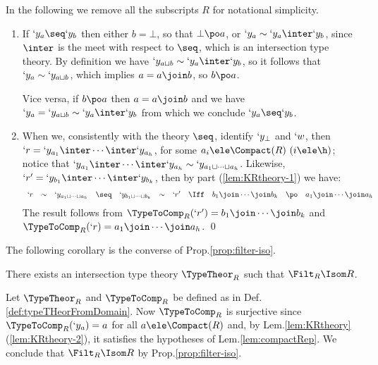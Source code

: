 \documentclass{CSML}
\begin{document}
\proof %
In the following we remove all the subscripts $R$ for notational simplicity.

 \begin{enumerate}

 \item 
If $`y_a \seq `y_b$ then either $b = \bot $, so that $\bot \po a$, or
$`y_a \sim `y_a \inter `y_b$, since $\inter$ is the meet with respect to $\seq$, which is an intersection type theory. 
By definition we have $`y_{a \sqcup b} \sim `y_a \inter `y_b$, so it follows that $`y_a \sim `y_{a \sqcup b}$, which implies $a = a \join b $, so $b \po a$.

Vice versa, if $b \po a$ then $a = a \join b$ and we have $`y_a = `y_{a \sqcup b} \sim `y_a \inter `y_b$ from which we conclude $`y_a \seq `y_b$.
	
 \item 
When we, consistently with the theory $\seq$, identify $`y_\bot$ and $`w$, then $`r = `y_ {a_1}\inter \cdots \inter `y_{a_h}$, for some $a_i \ele \Compact(R) ~ (i \ele \h)$; notice that $`y_ {a_1}\inter \cdots \inter `y_{a_h} \sim `y_{a_1\sqcup\cdots\sqcup a_h}$. 
Likewise, $`r' = `y_ {b_1}\inter \cdots \inter `y_{b_k } $, then by part (\ref{lem:KRtheory-1}) we have:
%
 \[ \begin{array}{rcl@{\quad}lccc@{\quad}c@{\quad}ccc}
`r 
	& \sim & 
`y_{a_1\sqcup\cdots\sqcup a_h} 
	& \seq & 
`y_{b_1\sqcup\cdots\sqcup b_k } 
	& \sim & 
`r' 
	&\Iff&
b_1\join\cdots\join b_k 
	&\po&
a_1\join\cdots\join a_h
 \end{array} \]
The result follows from %
$\TypeToComp_R(`r') = b_1\join\cdots\join b_k$ and $\TypeToComp_R(`r) = a_1\join\cdots\join a_h$.%
\qed
 \end{enumerate}

\noindent The following corollary is the converse of Prop.\skp\ref{prop:filter-iso}.


 \begin{cor} \label{cor:fromDomToFilter}
There exists an intersection type theory $\TypeTheor_R$ such that $\Filt_R \Isom R$.
 \end{cor}

 \begin{Proof}
Let $\TypeTheor_R$ and $\TypeToComp_R$ be defined as in Def.\skp\ref{def:typeTHeorFromDomain}.
Now $\TypeToComp_R$ is surjective since $\TypeToComp_R(`y_a) = a$ for all $a\ele \Compact(R)$ and, by Lem.\skp\ref{lem:KRtheory}\,(\ref{lem:KRtheory-2}), it satisfies the hypotheses of Lem.\skp\ref{lem:compactRep}.
We conclude that $\Filt_R \Isom R$ by Prop.\skp\ref{prop:filter-iso}. %
 \end{Proof}
\end{document}
